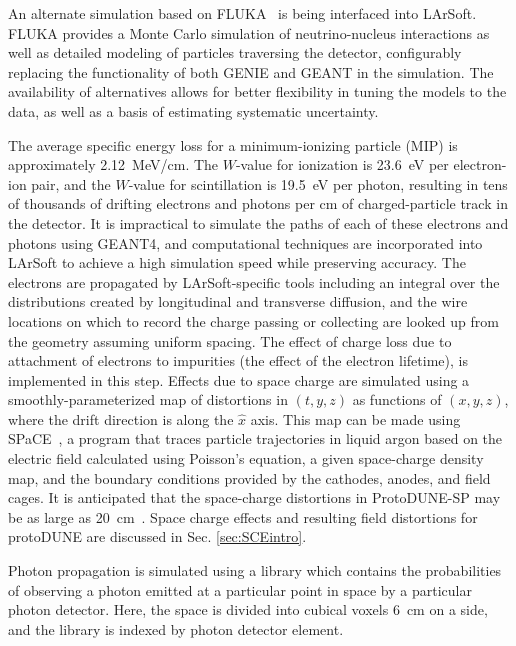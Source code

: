 An alternate simulation based on FLUKA~\cite{fluka} is being interfaced into LArSoft.
FLUKA provides a Monte Carlo simulation of neutrino-nucleus interactions as well as
detailed modeling of particles traversing the detector, configurably replacing the
functionality of both GENIE and GEANT in the simulation.  The availability of alternatives
allows for better flexibility in tuning the models to the data, as well as a basis of
estimating systematic uncertainty.

The average specific energy loss for a minimum-ionizing particle (MIP)
is approximately 2.12~MeV/cm.  The $W$-value for ionization is 23.6~eV
per electron-ion pair, and the $W$-value for scintillation is 19.5~eV
per photon, resulting in tens of thousands of drifting electrons and
photons per cm of charged-particle track in the detector.  It is
impractical to simulate the paths of each of these electrons and
photons using GEANT4, and computational techniques are incorporated
into LArSoft to achieve a high simulation speed while preserving
accuracy.  The electrons are propagated by LArSoft-specific tools
including an integral over the distributions created by longitudinal
and transverse diffusion, and the wire locations on which to record
the charge passing or collecting are looked up from the geometry
assuming uniform spacing.  The effect of charge loss due to attachment
of electrons to impurities (the effect of the electron lifetime), is
implemented in this step.  Effects due to space charge are simulated
using a smoothly-parameterized map of distortions in $(t,y,z)$ 
as functions of $(x,y,z)$, where the drift direction is along the
${\hat{x}}$ axis.  This map can be made using SPaCE~\cite{space}, a
program that traces particle trajectories in liquid argon based on the
electric field calculated using Poisson's equation, a given
space-charge density map, and the boundary conditions provided by the
cathodes, anodes, and field cages.  It is anticipated that the
space-charge distortions in ProtoDUNE-SP may be as large as
20~cm~\cite{space}. Space charge effects and resulting field distortions 
for protoDUNE are discussed in Sec. \ref{sec:SCEintro}.


Photon propagation is simulated using a library which contains the
probabilities of observing a photon emitted at a particular point in
space by a particular photon detector.  Here, the space is divided
into cubical voxels 6~cm on a side, and the library is indexed by photon
detector element. 

